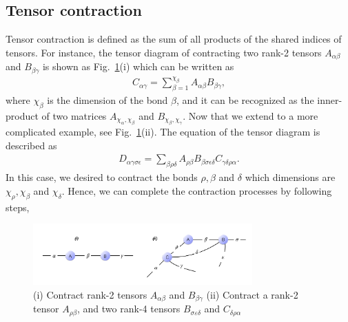
\subsection{Tensor contraction}

Tensor contraction is defined as the sum of all products of the shared indices of tensors. For instance, the tensor diagram of contracting two rank-2 tensors $A_{\alpha \beta}$ and $B_{\beta \gamma}$ is shown as Fig.~\ref{fig222}(i) which can be written as
\begin{align}
	C_{\alpha \gamma}=\sum\limits_{\beta = 1}^{\chi_{\beta}}{A_{\alpha \beta}B_{\beta \gamma}},
\end{align}
where $\chi_{\beta}$ is the dimension of the bond $\beta$, and it can be recognized as the inner-product of two matrices $A_{\chi_{\alpha}, \chi_{\beta}}$ and $B_{\chi_{\beta}, \chi_{\gamma}}$. Now that we extend to a more complicated example, see Fig.~\ref{fig222}(ii). The equation of the tensor diagram is described as
\begin{align}
	D_{\alpha \gamma \sigma \epsilon}=\sum_{\beta \rho \delta}{A_{\rho \beta}B_{\beta \sigma \epsilon \delta}C_{\gamma \delta \rho \alpha}}.
\end{align}
In this case, we desired to contract the bonds $\rho,\beta$ and $\delta$ which dimensions are $\chi_{\rho}, \chi_{\beta}$ and $\chi_{\delta}$. Hence, we can complete the contraction processes by following steps,

\begin{figure}[H]
	\centering
	\includegraphics[width=0.75\textwidth]{figures/fig222.png}
	\caption[The examples of tensor diagrams.]{(i) Contract rank-2 tensors $A_{\alpha \beta}$ and $B_{\beta \gamma} $ (ii) Contract a rank-2 tensor $A_{\rho \beta}$, and two rank-4 tensors $B_{\sigma \varepsilon \delta}$ and $C_{\delta \rho \alpha}$}
	\label{fig222}
\end{figure}

